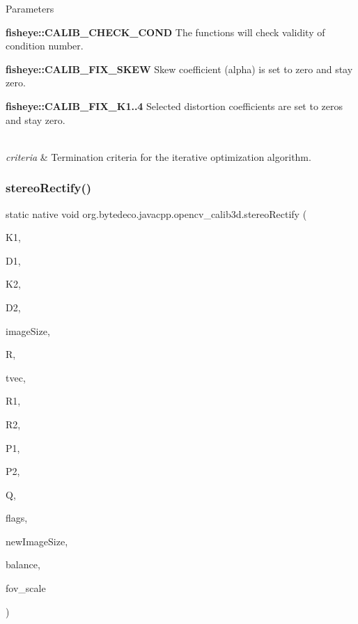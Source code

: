 \begin{DoxyParams}{Parameters}
\begin{DoxyItemize}
\item {\bfseries fisheye\+::\+C\+A\+L\+I\+B\+\_\+\+C\+H\+E\+C\+K\+\_\+\+C\+O\+ND} The functions will check validity of condition number.
\item {\bfseries fisheye\+::\+C\+A\+L\+I\+B\+\_\+\+F\+I\+X\+\_\+\+S\+K\+EW} Skew coefficient (alpha) is set to zero and stay zero.
\item {\bfseries fisheye\+::\+C\+A\+L\+I\+B\+\_\+\+F\+I\+X\+\_\+\+K1..4} Selected distortion coefficients are set to zeros and stay zero. 
\end{DoxyItemize}\\
\hline
{\em criteria} & Termination criteria for the iterative optimization algorithm. \\
\hline
\end{DoxyParams}
\mbox{\label{group__calib3d__fisheye_ga8733df626f7839fe698cc024f4836938}} 
\subsubsection{\texorpdfstring{stereo\+Rectify()}{stereoRectify()}}
{\footnotesize\ttfamily static native void org.\+bytedeco.\+javacpp.\+opencv\+\_\+calib3d.\+stereo\+Rectify (\begin{DoxyParamCaption}\item[{@By\+Val Mat}]{K1,  }\item[{@By\+Val Mat}]{D1,  }\item[{@By\+Val Mat}]{K2,  }\item[{@By\+Val Mat}]{D2,  }\item[{@Const @By\+Ref Size}]{image\+Size,  }\item[{@By\+Val Mat}]{R,  }\item[{@By\+Val Mat}]{tvec,  }\item[{@By\+Val Mat}]{R1,  }\item[{@By\+Val Mat}]{R2,  }\item[{@By\+Val Mat}]{P1,  }\item[{@By\+Val Mat}]{P2,  }\item[{@By\+Val Mat}]{Q,  }\item[{int}]{flags,  }\item[{@Const @By\+Ref(null\+Value=\char`\"{}cv\+::\+Size()\char`\"{}) Size}]{new\+Image\+Size,  }\item[{double}]{balance,  }\item[{double}]{fov\+\_\+scale }\end{DoxyParamCaption})\hspace{0.3cm}{\ttfamily [static]}}




